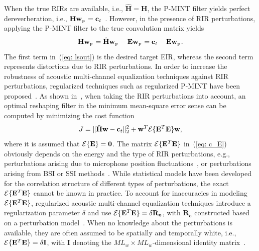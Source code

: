 \documentclass[draftcls,onecolumn,11pt]{IEEEtran}
\begin{document}
When the true RIRs are available, i.e., $\hat{\mathbf{H}} = \mathbf{H}$, the P-MINT filter yields perfect dereverberation, i.e., $\mathbf{H} \mathbf{w}_{_{\rm P}} = \mathbf{c}_t$~\cite{Kodrasi_ITASLP_2013}.
However, in the presence of RIR perturbations, applying the P-MINT filter to the true convolution matrix yields
\begin{equation}
\label{eq: lsout}
\mathbf{H}\mathbf{w}_{_{\rm P}} = \hat{\mathbf{H}} \mathbf{w}_{_{\rm P}} - \mathbf{E}\mathbf{w}_{_{\rm P}} = \mathbf{c}_t - \mathbf{E}\mathbf{w}_{_{\rm P}}.
\end{equation}
The first term in~(\ref{eq: lsout}) is the desired target EIR, whereas the second term represents distortions due to RIR perturbations.
In order to increase the robustness of acoustic multi-channel equalization techniques against RIR perturbations, regularized techniques such as regularized P-MINT have been proposed~\cite{Kodrasi_ITASLP_2013}.
As shown in~\cite{Hikichi_EURASIP_2007}, when taking the RIR perturbations into account, an optimal reshaping filter in the minimum mean-square error sense can be computed by minimizing the cost function
\begin{equation}
\label{eq: c_E}
J = \| \hat{\mathbf{H}}\mathbf{w} - \mathbf{c}_t\|_2^2 + \mathbf{w}^T {\cal{E}}\{\mathbf{E}^T\mathbf{E} \}\mathbf{w},
\end{equation}
where it is assumed that ${\cal{E}}\{\mathbf{E} \} = \mathbf{0}$.
The matrix ${\cal{E}}\{\mathbf{E}^T\mathbf{E} \}$ in~(\ref{eq: c_E}) obviously depends on the energy and the type of RIR perturbations, e.g., perturbations arising due to microphone position fluctuations~\cite{Radlovic_ITSA_2000,Jungmann_ITASLP_2012}, or perturbations arising from BSI or SSI methods~\cite{Haque_SPL_2008,Lin_ITASLP_2012,Lim_IWAENC_2014}.
While statistical models have been developed for the correlation structure of different types of perturbations, the exact ${\cal{E}}\{\mathbf{E}^T \mathbf{E} \}$ cannot be known in practice. 
To account for inaccuracies in modeling ${\cal{E}}\{\mathbf{E}^T\mathbf{E} \}$, regularized acoustic multi-channel equalization techniques introduce a regularization parameter $\delta$ and use ${\cal{E}}\{ \mathbf{E}^T \mathbf{E} \} = \delta \mathbf{R}_{\mathbf{e}}$, with $\mathbf{R}_{\mathbf{e}}$ constructed based on a perturbation model~\cite{Jungmann_ITASLP_2012, Lim_IWAENC_2014}. 
When no knowledge about the perturbations is available, they are often assumed to be spatially and temporally white, i.e., ${\cal{E}}\{\mathbf{E}^T \mathbf{E} \} = \delta \mathbf{I}$, with $\mathbf{I}$ denoting the $ML_w \times ML_w$-dimensional identity matrix~\cite{Hikichi_EURASIP_2007,Kodrasi_ITASLP_2013}.
\end{document}
